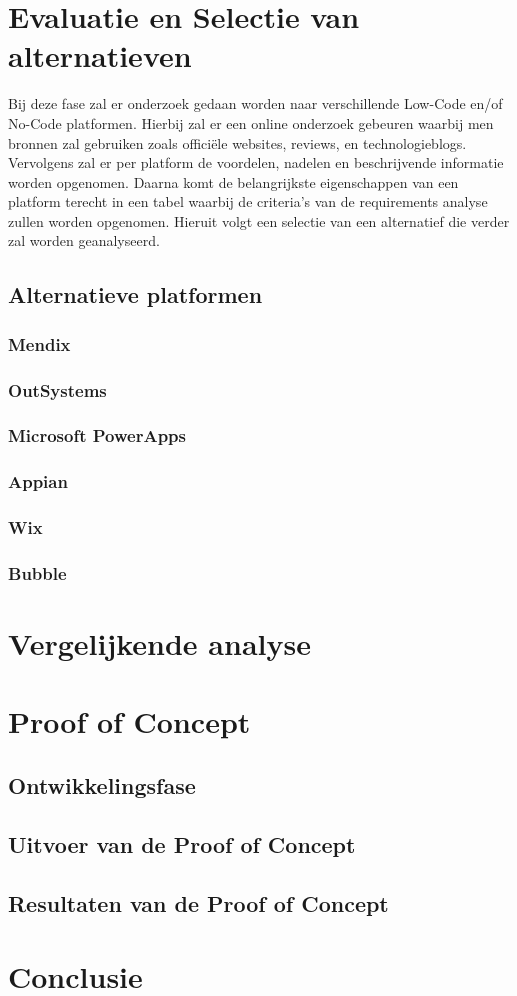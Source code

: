 \section*{Evaluatie en Selectie van alternatieven}
\label{sec:evaluatie-en-selectie-van-alternatieven}
Bij deze fase zal er onderzoek gedaan worden naar verschillende Low-Code en/of No-Code platformen. Hierbij zal 
er een online onderzoek gebeuren waarbij men bronnen zal gebruiken zoals officiële websites, reviews, en technologieblogs.
Vervolgens zal er per platform de voordelen, nadelen en beschrijvende informatie worden opgenomen. Daarna komt de belangrijkste
eigenschappen van een platform terecht in een tabel waarbij de criteria's van de requirements analyse zullen worden opgenomen. Hieruit volgt een
selectie van een alternatief die verder zal worden geanalyseerd.
\subsection*{Alternatieve platformen}
\label{subsec:alternatieve-platformen}

\subsubsection*{Mendix}
\subsubsection*{OutSystems}
\subsubsection*{Microsoft PowerApps}
\subsubsection*{Appian}
\subsubsection*{Wix}
\subsubsection*{Bubble}


\section*{Vergelijkende analyse}
\label{sec:vergelijkende-analyse}

\section*{Proof of Concept}
\label{sec:proof-of-concept}
\subsection*{Ontwikkelingsfase}
\subsection*{Uitvoer van de Proof of Concept}
\subsection*{Resultaten van de Proof of Concept}

\section*{Conclusie}


